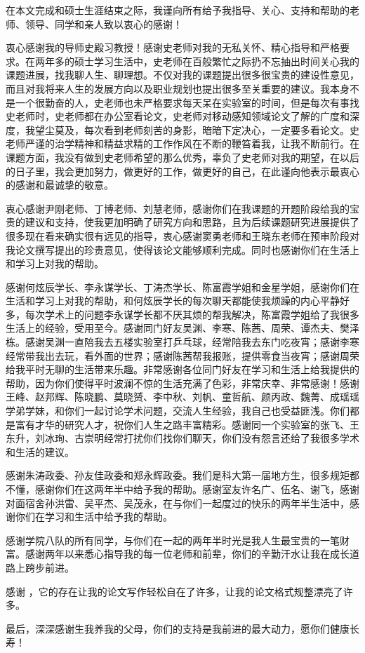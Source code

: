 

\begin{ack}
\par 在本文完成和硕士生涯结束之际，我谨向所有给予我指导、关心、支持和帮助的老师、领导、同学和亲人致以衷心的感谢！
\par 衷心感谢我的导师史殿习教授！感谢史老师对我的无私关怀、精心指导和严格要求。在两年多的硕士学习生活中，史老师在百般繁忙之际扔不忘抽出时间关心我的课题进展，找我聊人生、聊理想。不仅对我的课题提出很多很宝贵的建设性意见，而且对我将来人生的发展方向以及职业规划也提出很多至关重要的建议。我本身不是一个很勤奋的人，史老师也未严格要求每天呆在实验室的时间，但是每次有事找史老师时，史老师都在办公室看论文，史老师对移动感知领域论文了解的广度和深度，我望尘莫及，每次看到老师刻苦的身影，暗暗下定决心，一定要多看论文。史老师严谨的治学精神和精益求精的工作作风在不断的鞭笞着我，让我不断前行。在课题方面，我没有做到史老师希望的那么优秀，辜负了史老师对我的期望，在以后的日子里，我会更加努力，做更好的工作，做更好的自己，在此谨向他表示最衷心的感谢和最诚挚的敬意。
\par 衷心感谢尹刚老师、丁博老师、刘慧老师，感谢你们在我课题的开题阶段给我的宝贵的建议和支持，使我更加明确了研究方向和思路，且为后续课题研究进展提供了很多现在看来确实很有远见的指导，衷心感谢窦勇老师和王晓东老师在预审阶段对我论文撰写提出的珍贵意见，使得该论文能够顺利完成。同时也感谢你们在生活上和学习上对我的帮助。
\par 感谢何炫辰学长、李永谋学长、丁涛杰学长、陈富霞学姐和金星学姐，感谢你们在生活和学习上对我的帮助，和何炫辰学长的每次聊天都能使我烦躁的内心平静好多，每次学术上的问题李永谋学长都不厌其烦的帮我解决，陈富霞学姐给了我很多生活上的经验，受用至今。感谢同门好友吴渊、李寒、陈茜、周荣、谭杰夫、樊泽栋。感谢吴渊一直陪我去五楼实验室打乒乓球，经常陪我去东门吃夜宵；感谢李寒经常带我出去玩，看外面的世界；感谢陈茜帮我报账，提供零食当夜宵；感谢周荣给我平时无聊的生活带来乐趣。非常感谢各位同门好友在学习和生活上给我提供的帮助，因为你们使得平时波澜不惊的生活充满了色彩，非常庆幸、非常感谢！感谢王峰、赵邦辉、陈晓鹏、莫晓赟、李中秋、刘帆、童哲航、颜丙政、魏菁、成瑶瑶学弟学妹，和你们一起讨论学术问题，交流人生经验，我自己也受益匪浅。你们都是富有才华的研究人才，祝你们人生之路丰富精彩。感谢同一个实验室的张飞、王东升，刘冰珣、古崇明经常打扰你们找你们聊天，你们没有怨言还给了我很多学术和生活的建议。
\par 感谢朱涛政委、孙友佳政委和郑永辉政委。我们是科大第一届地方生，很多规矩都不懂，感谢你们在这两年半中给予我的帮助。感谢室友许名广、伍名、谢飞，感谢对面宿舍孙洪雷、吴平杰、吴茂永，在与你们一起度过的快乐的两年半生活中，感谢你们在学习和生活中给予我的帮助。
\par 感谢学院八队的所有同学，与你们在一起的两年半时光是我人生最宝贵的一笔财富。感谢两年以来悉心指导我的每一位老师和前辈，你们的辛勤汗水让我在成长道路上跨步前进。
\par 感谢 \nudtpaper{}，它的存在让我的论文写作轻松自在了许多，让我的论文格式规整漂亮了许多。
\par 最后，深深感谢生我养我的父母，你们的支持是我前进的最大动力，愿你们健康长寿！

\end{ack}
